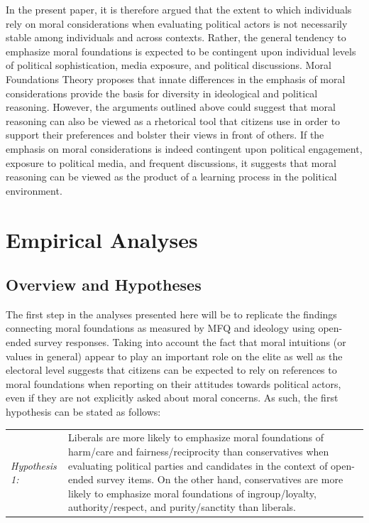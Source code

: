 \documentclass[12pt]{article}
\begin{document}
In the present paper, it is therefore argued that the extent to which individuals rely on moral considerations when evaluating political actors is not necessarily stable among individuals and across contexts. Rather, the general tendency to emphasize moral foundations is expected to be contingent upon individual levels of political sophistication, media exposure, and political discussions. Moral Foundations Theory proposes that innate differences in the emphasis of moral considerations provide the basis for diversity in ideological and political reasoning. However, the arguments outlined above could suggest that moral reasoning can also be viewed as a rhetorical tool that citizens use in order to support their preferences and bolster their views in front of others. If the emphasis on moral considerations is indeed contingent upon political engagement, exposure to political media, and frequent discussions, it suggests that moral reasoning can be viewed as the product of a learning process in the political environment.


\section{Empirical Analyses}

\subsection{Overview and Hypotheses}

The first step in the analyses presented here will be to replicate the findings connecting moral foundations as measured by MFQ and ideology using open-ended survey responses. Taking into account the fact that moral intuitions (or values in general) appear to play an important role on the elite as well as the electoral level suggests that citizens can be expected to rely on references to moral foundations when reporting on their attitudes towards political actors, even if they are not explicitly asked about moral concerns. As such, the first hypothesis can be stated as follows:

\vspace{0.3cm}
\begin{tabular}{lp{12cm}}
\textsl{Hypothesis 1:} & Liberals are more likely to emphasize moral foundations of harm/care and fairness/reciprocity  than conservatives when evaluating political parties and candidates in the context of open-ended survey items. On the other hand, conservatives are more likely to emphasize moral foundations of ingroup/loyalty, authority/respect, and purity/sanctity than liberals.
\end{tabular}
\vspace{0.5cm}
\end{document}
